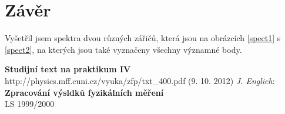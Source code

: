 \documentclass[a4paper,12pt]{article}
\begin{document}
\section{Závěr}
Vyšetřil jsem spektra dvou různých zářičů, která jsou na obrázcích \ref{spect1} s \ref{spect2}, na kterých jsou také vyznačeny všechny významné body.

\begin{thebibliography}{5}
	 \textbf{Studijní text na praktikum IV} \\http://physics.mff.cuni.cz/vyuka/zfp/txt\_400.pdf (9. 10. 2012)
     \emph{J. Englich}: \textbf{Zpracování výsldků fyzikálních měření} \\ LS 1999/2000
\end{thebibliography}
\end{document}
